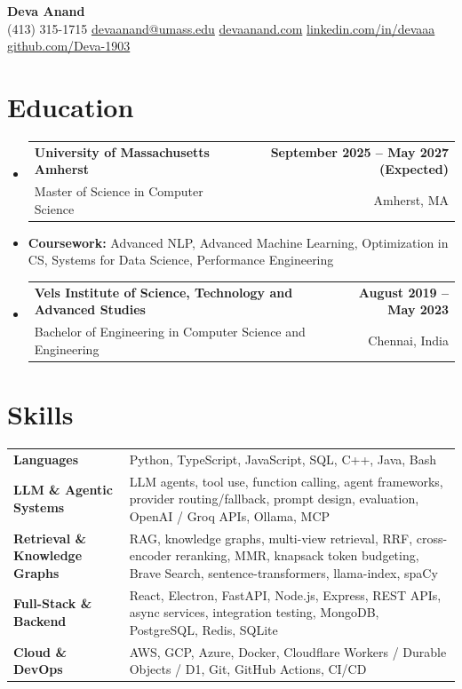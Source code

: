 \documentclass[letterpaper,10pt]{article}
\makeatletter
\newcommand{\resumeSubheading}[4]{
  \vspace{1pt}\item
    \begin{tabular*}{0.985\textwidth}[t]{l@{\extracolsep{\fill}}r}
      \textbf{#1} & \textbf{\small #2} \\
      {\small\color{ResumeSlate} #3} & {\small\color{ResumeSlate} #4} \\
    \end{tabular*}\vspace{-6pt}
}
\newcommand{\resumeSubItem}[1]{\item[]\small{#1\vspace{-1pt}}}
\newcommand{\resumeSubHeadingListStart}{\begin{itemize}[leftmargin=0.0in, label={}, itemsep=2pt, topsep=2pt]}
\newcommand{\resumeSubHeadingListEnd}{\end{itemize}}
\makeatother
\begin{document}
\begin{center}
    {\LARGE \bfseries \textcolor{ResumeNavy}{Deva Anand}} \\ \vspace{4pt}
    \small
    (413) 315-1715 \enspace\textbar\enspace
    \href{mailto:devaanand@umass.edu}{devaanand@umass.edu} \enspace\textbar\enspace
    \href{https://devaanand.com}{devaanand.com} \enspace\textbar\enspace
    \href{https://linkedin.com/in/devaaa/}{linkedin.com/in/devaaa} \enspace\textbar\enspace
    \href{https://github.com/Deva-1903}{github.com/Deva-1903}
    \vspace{-6pt}
\end{center}
\section{Education}
\resumeSubHeadingListStart
  \resumeSubheading
    {University of Massachusetts Amherst}{September 2025 -- May 2027 (Expected)}
    {Master of Science in Computer Science}{Amherst, MA}
  \resumeSubItem{\textbf{Coursework:} Advanced NLP, Advanced Machine Learning, Optimization in CS, Systems for Data Science, Performance Engineering}
  \resumeSubheading
    {Vels Institute of Science, Technology and Advanced Studies}{August 2019 -- May 2023}
    {Bachelor of Engineering in Computer Science and Engineering}{Chennai, India}
\resumeSubHeadingListEnd
\vspace{-4pt}
\section{Skills}
{\small
\begin{tabularx}{0.985\textwidth}{@{}>{\bfseries}p{1.36in}@{\hspace{0.45em}}X@{}}
  Languages & Python, TypeScript, JavaScript, SQL, C++, Java, Bash \\
  LLM \& Agentic Systems & LLM agents, tool use, function calling, agent frameworks, provider routing/fallback, prompt design, evaluation, OpenAI / Groq APIs, Ollama, MCP \\
  Retrieval \& Knowledge Graphs & RAG, knowledge graphs, multi-view retrieval, RRF, cross-encoder reranking, MMR, knapsack token budgeting, Brave Search, sentence-transformers, llama-index, spaCy \\
  Full-Stack \& Backend & React, Electron, FastAPI, Node.js, Express, REST APIs, async services, integration testing, MongoDB, PostgreSQL, Redis, SQLite \\
  Cloud \& DevOps & AWS, GCP, Azure, Docker, Cloudflare Workers / Durable Objects / D1, Git, GitHub Actions, CI/CD \\
\end{tabularx}
}
\vspace{-4pt}
\end{document}
